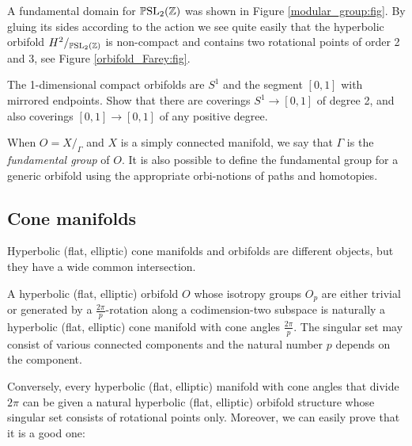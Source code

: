 \begin{example}
A fundamental domain for $\mathbb{P}{\rm SL}_2(\mathbb{Z})$ was shown in Figure \ref{modular_group:fig}. By gluing its sides according to the action we see quite easily that the hyperbolic orbifold $H^2/_{\mathbb{P}{\rm SL}_2(\mathbb{Z})}$ is non-compact and contains two rotational points of order 2 and 3, see Figure \ref{orbifold_Farey:fig}.
\end{example}

\begin{ex} The 1-dimensional compact orbifolds are $S^1$ and the segment $[0,1]$ with mirrored endpoints. Show that there are coverings $S^1 \to [0,1]$ of degree 2, and also coverings $[0,1] \to [0,1]$ of any positive degree.
\end{ex}

When $O=X/_\Gamma$ and $X$ is a simply connected manifold, we say that $\Gamma$ is the \emph{fundamental group} of $O$. It is also possible to define the fundamental group for a generic orbifold using the appropriate orbi-notions of paths and homotopies. 

\subsection{Cone manifolds}
Hyperbolic (flat, elliptic) cone manifolds and orbifolds are different objects, but they have a wide common intersection.

A hyperbolic (flat, elliptic) orbifold $O$ whose isotropy groups $O_p$ are either trivial or generated by a $\frac{2\pi }p$-rotation along a codimension-two subspace is naturally a hyperbolic (flat, elliptic) cone manifold with cone angles $\frac{2 \pi}p$. The singular set may consist of various connected components and the natural number $p$ depends on the component. 

Conversely, every hyperbolic (flat, elliptic) manifold with cone angles that divide $2\pi$ can be given a natural hyperbolic (flat, elliptic) orbifold structure whose singular set consists of rotational points only. Moreover, we can easily prove that it is a good one:

